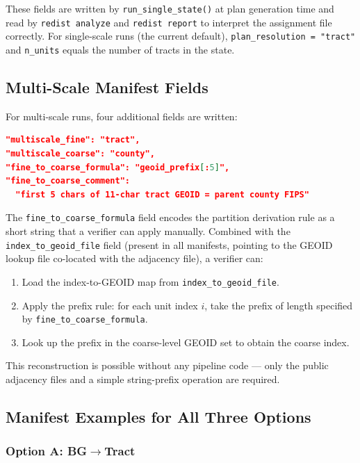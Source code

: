 These fields are written by \texttt{run\_single\_state()} at plan generation
time and read by \texttt{redist analyze} and \texttt{redist report} to
interpret the assignment file correctly.
For single-scale runs (the current default), \texttt{plan\_resolution = "tract"}
and \texttt{n\_units} equals the number of tracts in the state.

\subsection{Multi-Scale Manifest Fields}

For multi-scale runs, four additional fields are written:

\begin{lstlisting}[language=json]
"multiscale_fine": "tract",
"multiscale_coarse": "county",
"fine_to_coarse_formula": "geoid_prefix[:5]",
"fine_to_coarse_comment":
  "first 5 chars of 11-char tract GEOID = parent county FIPS"
\end{lstlisting}

\noindent
The \texttt{fine\_to\_coarse\_formula} field encodes the partition derivation
rule as a short string that a verifier can apply manually.
Combined with the \texttt{index\_to\_geoid\_file} field (present in all
manifests, pointing to the GEOID lookup file co-located with the adjacency
file), a verifier can:
\begin{enumerate}
  \item Load the index-to-GEOID map from \texttt{index\_to\_geoid\_file}.
  \item Apply the prefix rule: for each unit index $i$, take the prefix
        of length specified by \texttt{fine\_to\_coarse\_formula}.
  \item Look up the prefix in the coarse-level GEOID set to obtain the
        coarse index.
\end{enumerate}
This reconstruction is possible without any pipeline code --- only the
public adjacency files and a simple string-prefix operation are required.

\subsection{Manifest Examples for All Three Options}

\subsubsection{Option A: BG$\to$Tract}

